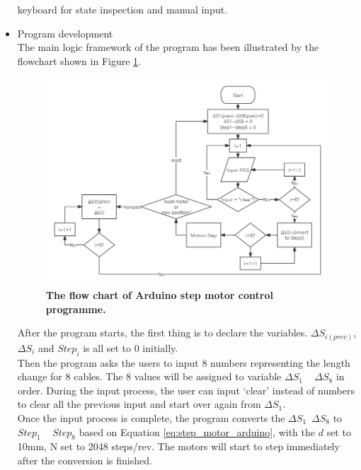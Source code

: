 \begin{itemize}
    keyboard for state inspection and manual input.
    \item Program development \\
    The main logic framework of the program has been illustrated by the flowchart shown in Figure \ref{fig:motor_flowchart}.
    \begin{figure}[H] %
        \centering %
        \captionsetup{labelsep=colon}
        \includegraphics[width=1.0\textwidth]{Image/Design/flowchart_arduino_motor.png} 
        \caption[The flow chart of Arduino step motor control programme]
        {\centering \textbf{The flow chart of Arduino step motor control programme.}}
        \label{fig:motor_flowchart}
    \end{figure}
    After the program starts, the first thing is to declare the variables. $\Delta S_{i(prev)}$, $\Delta S_i$ and 
    $Step_i$ is all set to 0 initially. \\ Then the program asks the users to input 8 numbers representing the 
    length change for 8 cables. The 8 values will be assigned to variable $\Delta S_1$ ~ $\Delta S_8$ in order. 
    During the input process, the user can input `clear' instead of numbers to clear all the previous input and 
    start over again from $\Delta S_1$. \\
    Once the input process is complete, the program converts the $\Delta S_1$~$\Delta S_8$ to $Step_1$ ~ $Step_8$ 
    based on Equation \ref{eq:step_motor_arduino}, with the $d$ set to 10mm, N set to 2048 steps/rev. The motors 
    will start to step immediately after the conversion is finished. \\

\end{itemize}
